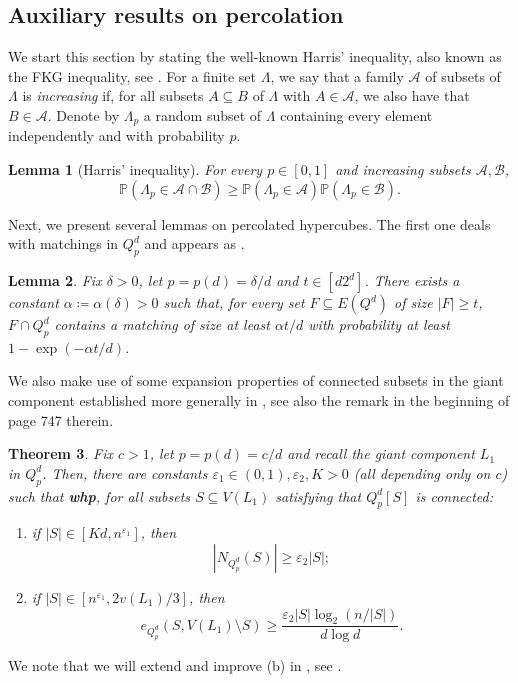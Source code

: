 \documentclass[reqno,final,a4paper]{amsart}
\newtheorem{thm}{Theorem}[section]
\newtheorem{lemma}[thm]{Lemma}
\theoremstyle{definition}
\newcommand{\cA}{\mathcal{A}}
\newcommand{\cB}{\mathcal{B}}
\def\eps{\varepsilon}
\newcommand{\1}{\mathbbm{1}}
\begin{document}
\subsection{Auxiliary results on percolation}
We start this section by stating the well-known Harris' inequality, also known as the FKG inequality, see \cite[Theorem 6.3.3]{AS16}.
For a finite set $\Lambda$, we say that a family $\cA$ of subsets of $\Lambda$ is \emph{increasing} if, for all subsets $A\subseteq B$ of $\Lambda$ with $A\in \cA$, we also have that $B\in \cA$.
Denote by $\Lambda_p$ a random subset of $\Lambda$ containing every element independently and with probability $p$.

\begin{lemma}[Harris' inequality]\label{lem:Harris}
For every $p\in [0,1]$ and increasing subsets $\cA,\cB$, $$\mathbb P(\Lambda_p\in \cA\cap \cB)\ge \mathbb P(\Lambda_p\in \cA)\mathbb P(\Lambda_p\in \cB).$$
\end{lemma}

Next, we present several lemmas on percolated hypercubes. The first one deals with matchings in $Q^d_p$ and appears as \cite[Lemma 2.9]{EKK22}.
\begin{lemma}\label{l: matchings}
Fix $\delta>0$, let $p=p(d)=\delta/d$ and $t\in [d2^d]$. 
There exists a constant $\alpha\coloneqq\alpha(\delta)>0$ such that, for every set $F\subseteq E(Q^d)$ of size $|F|\ge t$, $F\cap Q^d_p$ contains a matching of size at least $\alpha t/d$ with probability at least $1-\exp(-\alpha t/d)$. 
\end{lemma}

We also make use of some expansion properties of connected subsets in the giant component established more generally in \cite[Theorem~4]{DEKK24}, see also the remark in the beginning of page 747 therein.

\begin{thm}\label{thm: old expansion}
Fix $c>1$, let $p=p(d)=c/d$ and recall the giant component $L_1$ in $Q^d_p$. 
Then, there are constants $\eps_1\in (0,1),\eps_2,K>0$ (all depending only on $c$) such that \textbf{whp}, for all subsets $S\subseteq V(L_1)$ satisfying that $Q^d_p[S]$ is connected:
\begin{enumerate}[label=\upshape(\alph*)]
    \item if $|S| \in [Kd, n^{\eps_1}]$, then
    $$|N_{Q^d_p}(S)|\ge \eps_2|S|;$$
    \item if $|S| \in [n^{\eps_1}, 2v(L_1)/3]$, then
    $$e_{Q^d_p}(S, V(L_1)\setminus S)\ge \frac{\eps_2|S|\log_2(n/|S|)}{d\log d}.$$
\end{enumerate}
\end{thm}
We note that we will extend and improve (b) in , see .
\end{document}
